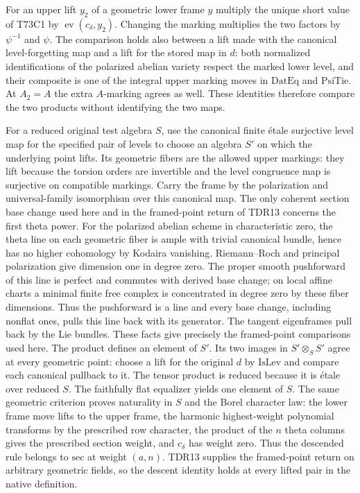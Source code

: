 For an upper lift $y_2$ of a geometric lower frame $y$ multiply
the unique short value of T73C1 by $\operatorname{ev}(c_\delta,y_2)$.
Changing the marking multiplies the two factors by $\psi^{-1}$
and $\psi$. The comparison holds also between a lift made with
the canonical level-forgetting map and a lift for the stored
map in $d$: both normalized identifications of the polarized
abelian variety respect the marked lower level, and their
composite is one of the integral upper marking moves in
$\mathrm{DatEq}$ and $\mathrm{PsiTie}$. At $A_2=A$ the extra
$A$-marking agrees as well. These identities therefore compare
the two products without identifying the two maps.

For a reduced original test algebra $S$, use the canonical
finite étale surjective level map for the specified pair
of levels to choose an algebra $S'$ on which the
underlying point lifts. Its geometric fibers are the allowed
upper markings: they lift because the torsion orders are
invertible and the level congruence map is surjective on
compatible markings. Carry the frame by the polarization and
universal-family isomorphism over this canonical map.
The only coherent section base change used here and in the
framed-point return of TDR13 concerns the first theta power.
For the polarized abelian scheme in characteristic zero, the
theta line on each geometric fiber is ample with trivial
canonical bundle, hence has no higher cohomology by Kodaira
vanishing. Riemann--Roch and principal polarization give
dimension one in degree zero. The proper smooth pushforward
of this line is perfect and commutes with derived base change;
on local affine charts a minimal finite free complex is
concentrated in degree zero by these fiber dimensions. Thus
the pushforward is a line and every base change, including
nonflat ones, pulls this line back with its generator. The
tangent eigenframes pull back by the Lie bundles. These facts
give precisely the framed-point comparisons used here.
The product defines an element of $S'$. Its two images in
$S'\otimes_S S'$ agree at every geometric point: choose
a lift for the original $d$ by $\mathrm{IsLev}$ and compare
each canonical pullback to it. The tensor product is reduced
because it is étale over reduced $S$. The faithfully flat
equalizer yields one element of $S$. The same
geometric criterion proves naturality in $S$ and the Borel character
law: the lower frame move lifts to the upper frame, the harmonic
highest-weight polynomial transforms by the prescribed row character,
the product of the $n$ theta columns gives the prescribed section
weight, and $c_\delta$ has weight zero. Thus the descended rule
belongs to $\mathrm{sec}$ at weight $(a,n)$. TDR13 supplies the
framed-point return on arbitrary geometric fields, so the descent
identity holds at every lifted pair in the native definition.

